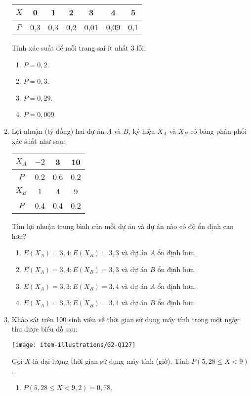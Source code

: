 \begin{enumerate}[label=\textbf{Câu \arabic*.},align=left,left=0cm..0cm,itemindent=*]
\begin{longtable}{|c|c|c|c|c|c|c|}
	$X$ & 0   & 1   & 2   & 3 	& 4 	& 5   \\\hline
	$P$ & 0,3 & 0,3 & 0,2 & 0,01 & 0,09 & 0,1 \\\hline
	\end{longtable}
	Tính xác suất để mỗi trang sai ít nhất 3 lỗi.
	\begin{enumerate}[label=\textbf{\Alph*.},align=left,left=1cm..0cm,itemindent=*]
		\item $P=0,2$. \item $P=0,3$. \item $P=0,29$. \item $P=0,009$.
	\end{enumerate}
	\item Lợi nhuận (tỷ đồng) hai dự án $A$ và $B$, ký hiệu $X_A$ và $X_B$ có bảng phân phối xác suất như sau:
	\begin{longtable}{|c|c|c|c|}\hline
	$X_A$ & $-2$ & 3   & 10  \\\hline
	$P$   & 0.2  & 0.6 & 0.2 \\\hline\hline
	$X_B$ & 1 	& 4   & 9   \\\hline
	$P$   & 0.4  & 0.4 & 0.2 \\\hline
	\end{longtable}
	Tìm lợi nhuận trung bình của mỗi dự án và dự án nào có độ ổn định cao hơn?
	\begin{enumerate}[label=\textbf{\Alph*.},align=left,left=1cm..0cm,itemindent=*]
		\item $E\left( {{X}_{A}} \right)=3,4; E\left( {{X}_{B}} \right)=3,3$ và dự án $A$ ổn định hơn.
		\item $E\left( {{X}_{A}} \right)=3,4; E\left( {{X}_{B}} \right)=3,3$ và dự án $B$ ổn định hơn.
		\item $E\left( {{X}_{A}} \right)=3,3; E\left( {{X}_{B}} \right)=3,4$ và dự án $A$ ổn định hơn.
		\item $E\left( {{X}_{A}} \right)=3,3; E\left( {{X}_{B}} \right)=3,4$ và dự án $B$ ổn định hơn.
	\end{enumerate}
	\item Khảo sát trên 100 sinh viên về thời gian sử dụng máy tính trong một ngày thu được biểu đồ sau:\par
	{\centering\texttt{[image: item-illustrations/G2-Q127]}\par}
	Gọi $X$ là đại lượng thời gian sử dụng máy tính (giờ). Tính $P\left( 5,28\leqslant X<9 \right)$.
	\begin{enumerate}[label=\textbf{\Alph*.},align=left,left=1cm..0cm,itemindent=*]
		\item $P\left( 5,28\leqslant X<9,2 \right)=0,78$.

\end{enumerate}
\end{enumerate}
